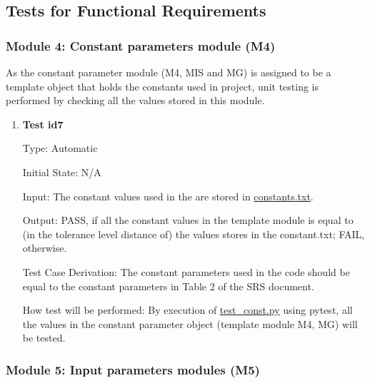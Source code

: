 \documentclass[12pt, titlepage]{article}
\begin{document}
\subsection{Tests for Functional Requirements}


\subsubsection{Module 4: Constant parameters module (M4)}

As the constant parameter module (M4, MIS and MG) is assigned to be a template object that holds the constants used in project, unit testing is performed by checking all the values stored in this module.

\begin{enumerate}

\item{\textbf{Test id7} \\}

Type: Automatic
					
Initial State: N/A
					
Input: The constant values used in the \progname{} are stored in  \href{https://github.com/shmouses/SPDFM/tree/master/src/constants.txt}{constants.txt}. 
					
Output: PASS, if all the constant values in the template module is equal to (in the tolerance level distance of) the values stores in the constant.txt; FAIL, otherwise. 

Test Case Derivation: The constant parameters used in the code should be equal to the constant parameters in Table 2 of the SRS document.

How test will be performed:  By execution of  \href{https://github.com/shmouses/SPDFM/tree/master/src/test_const.py}{test\_const.py} using pytest, all the values in the constant parameter object (template module M4, MG) will be tested. 
    
\end{enumerate}

\subsubsection{Module 5: Input parameters modules (M5)}
\end{document}
